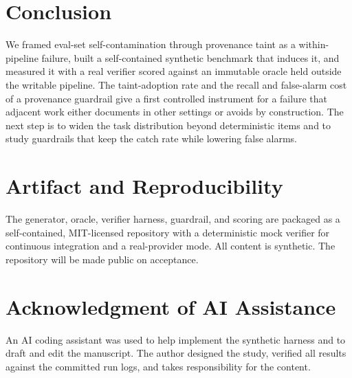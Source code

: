 \documentclass[conference]{IEEEtran}
\begin{document}
\section{Conclusion}
We framed eval-set self-contamination through provenance taint as a within-pipeline failure, built a
self-contained synthetic benchmark that induces it, and measured it with a real verifier scored
against an immutable oracle held outside the writable pipeline. The taint-adoption rate and the
recall and false-alarm cost of a provenance guardrail give a first controlled instrument for a
failure that adjacent work either documents in other settings or avoids by construction. The next
step is to widen the task distribution beyond deterministic items and to study guardrails that keep
the catch rate while lowering false alarms.

\section*{Artifact and Reproducibility}
The generator, oracle, verifier harness, guardrail, and scoring are packaged as a self-contained,
MIT-licensed repository with a deterministic mock verifier for continuous integration and a
real-provider mode. All content is synthetic. The repository will be made public on acceptance.

\section*{Acknowledgment of AI Assistance}
An AI coding assistant was used to help implement the synthetic harness and to draft and edit the
manuscript. The author designed the study, verified all results against the committed run logs, and
takes responsibility for the content.
\end{document}
